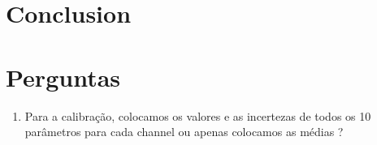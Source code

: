\documentclass{article}
\begin{document}
\begin{multicols}{2}
\section{Conclusion}

\section{Perguntas}

\begin{enumerate}
    \item Para a calibração, colocamos os valores e as incertezas de todos os 10 parâmetros para cada channel ou apenas colocamos as médias ?
\end{enumerate}

\section{}


\printbibliography
\nocite{*}

\end{multicols}
\end{document}
